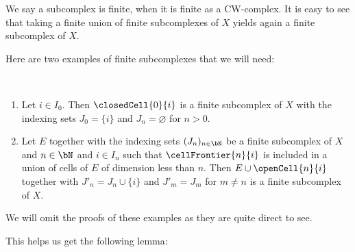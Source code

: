 \begin{rem} \label{rem:unionfinitesubcomplexes}
    We say a subcomplex is finite, when it is finite as a CW-complex.
    It is easy to see that taking a finite union of finite subcomplexes of $X$ yields again a finite subcomplex of $X$. \href{https://github.com/scholzhannah/CWComplexes/blob/7be4872a05b534011cc969eb5b80a4b7f0bf57e2/CWcomplexes/subcomplex.lean#L211-L224}{\faExternalLink}
\end{rem}

Here are two examples of finite subcomplexes that we will need:

\begin{example} \label{example:subcomplexes} ~
    \begin{enumerate}
        \item Let $i \in I_0$. Then $\closedCell{0}{i}$ is a finite subcomplex of $X$ with the indexing sets $J_0 = \{i\}$ and $J_n = \varnothing$ for $n > 0$.
        \href{https://github.com/scholzhannah/CWComplexes/blob/7be4872a05b534011cc969eb5b80a4b7f0bf57e2/CWcomplexes/subcomplex.lean#L246-L271}{\faExternalLink}
        \item Let $E$ together with the indexing sets $(J_n)_{n \in \bN}$ be a finite subcomplex of $X$ and $n \in \bN$ and $i \in I_n$ such that $\cellFrontier{n}{i}$ is included in a union of cells of $E$ of dimension less than $n$. 
        Then $E \cup \openCell{n}{i}$ together with $J'_n = J_n \cup \{i\}$ and $J'_m = J_m$ for $m \ne n$ is a finite subcomplex of $X$.
        \href{https://github.com/scholzhannah/CWComplexes/blob/7be4872a05b534011cc969eb5b80a4b7f0bf57e2/CWcomplexes/subcomplex.lean#L308-L334}{\faExternalLink}
       \end{enumerate}
\end{example}

We will omit the proofs of these examples as they are quite direct to see. 

This helps us get the following lemma: 

